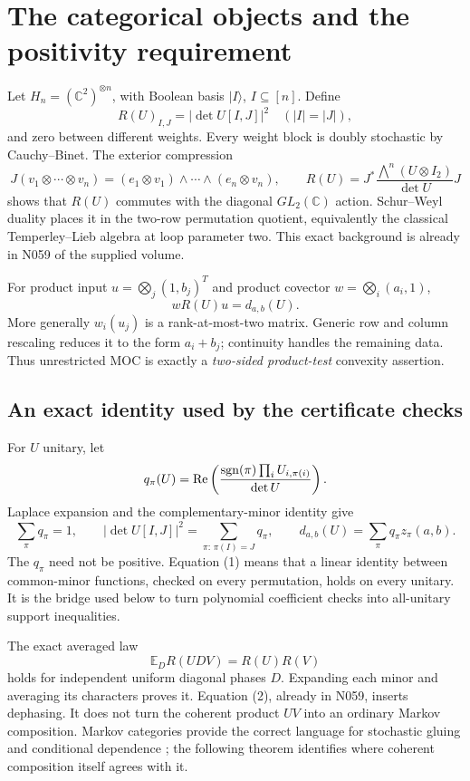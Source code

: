 \documentclass[11pt]{article}
\newcommand{\C}{\mathbb C}\newcommand{\R}{\mathbb R}\newcommand{\conv}{\operatorname{conv}}
\begin{document}
\newpage
\section{The categorical objects and the positivity requirement}
Let $H_n=(\C^2)^{\otimes n}$, with Boolean basis $|I\rangle$, $I\subseteq[n]$. Define
\[
R(U)_{I,J}=|\det U[I,J]|^2\quad(|I|=|J|),
\]
and zero between different weights. Every weight block is doubly stochastic by Cauchy--Binet. The exterior compression
\[
J(v_1\otimes\cdots\otimes v_n)
 =(e_1\otimes v_1)\wedge\cdots\wedge(e_n\otimes v_n),
\qquad
R(U)=J^*\frac{\bigwedge^n(U\otimes I_2)}{\det U}J
\]
shows that $R(U)$ commutes with the diagonal $GL_2(\C)$ action.
Schur--Weyl duality places it in the two-row permutation quotient, equivalently the classical Temperley--Lieb algebra at loop parameter two. This exact background is already in N059 of the supplied volume.

For product input $u=\bigotimes_j(1,b_j)^T$ and product covector $w=\bigotimes_i(a_i,1)$,
\[
wR(U)u=d_{a,b}(U).
\]
More generally $w_i(u_j)$ is a rank-at-most-two matrix. Generic row and column rescaling reduces it to the form $a_i+b_j$; continuity handles the remaining data. Thus unrestricted MOC is exactly a \emph{two-sided product-test} convexity assertion.


\subsection{An exact identity used by the certificate checks}
For $U$ unitary, let
\[
q_\pi(U)=\operatorname{Re}\left(\frac{\operatorname{sgn}(\pi)\prod_iU_{i,\pi(i)}}{\det U}\right).
\]
Laplace expansion and the complementary-minor identity give
\[
\sum_\pi q_\pi=1,\qquad
|\det U[I,J]|^2=\sum_{\pi:\,\pi(I)=J}q_\pi,\qquad
d_{a,b}(U)=\sum_\pi q_\pi z_\pi(a,b).
\tag{1}
\]
The $q_\pi$ need not be positive. Equation (1) means that a linear identity between common-minor functions, checked on every permutation, holds on every unitary. It is the bridge used below to turn polynomial coefficient checks into all-unitary support inequalities.


The exact averaged law
\[
\mathbb E_D R(UDV)=R(U)R(V)
\tag{2}
\]
holds for independent uniform diagonal phases $D$. Expanding each minor and averaging its characters proves it. Equation (2), already in N059, inserts dephasing. It does not turn the coherent product $UV$ into an ordinary Markov composition. Markov categories provide the correct language for stochastic gluing and conditional dependence \cite{fritz}; the following theorem identifies where coherent composition itself agrees with it.
\end{document}

